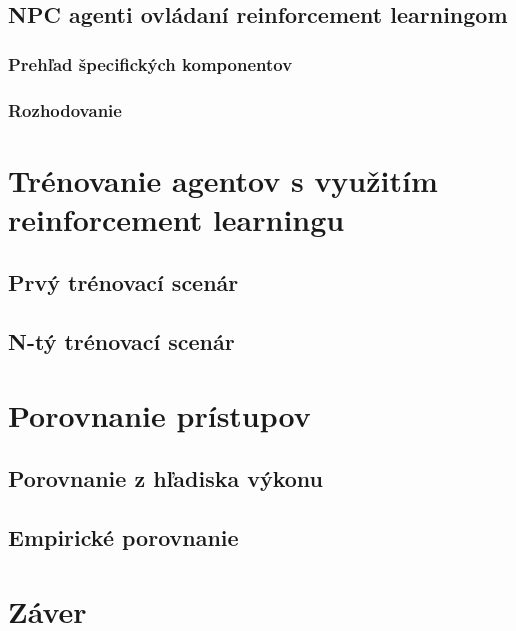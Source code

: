 \documentclass[slovak, master]{diploma}
\begin{document}
\section{NPC agenti ovládaní reinforcement learningom}
\label{sec:AgentsWithBrain}
\subsection{Prehľad špecifických komponentov}
\label{secAgentsWithBrainComponentOverview} 

\subsection{Rozhodovanie}
\label{sec:ImplReinforcementLearningMLAgent}

\chapter{Trénovanie agentov s využitím reinforcement learningu}
\label{sec:Training}
\section{Prvý trénovací scenár}
\label{sec:FirstScenario}
\section{N-tý trénovací scenár}
\label{sec:LastScenario}

\chapter{Porovnanie prístupov}
\label{sec:ImplReinforcement learning}
\section{Porovnanie z hľadiska výkonu}
\label{sec:Performance}
\section{Empirické porovnanie}
\label{sec:Gameplay}

\chapter{Záver}
\label{sec:Conclusion}

%

\printbibliography[title={Literatúra}, heading=bibintoc]
\end{document}
